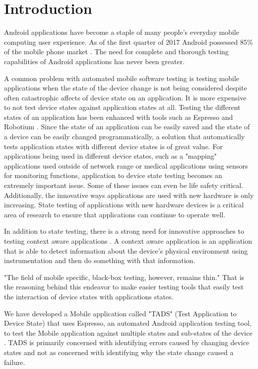 \section{Introduction}
Android applications have become a staple of many people's everyday mobile computing user experience.  As of the first quarter of 2017 Android possessed 85\% of the mobile phone market \cite{chau_2017}.  The need for complete and thorough testing capabilities of Android applications has never been greater.  

A common problem with automated mobile software testing is testing mobile applications when the state of the device change is not being considered despite often catastrophic affects of device state on an application.  It is more expensive to not test device states against application states at all.  Testing the different states of an application has been enhanced with tools such as Espresso and Robotium \cite{optimusinformationinc2016}.  Since the state of an application can be easily saved and the state of a device can be easily changed programmatically, a solution that automatically tests application states with different device states is of great value.  For applications being used in different device states, such as a "mapping" applications used outside of network range or medical applications using sensors for monitoring functions, application to device state testing becomes an extremely important issue.  Some of these issues can even be life safety critical.  Additionally, the innovative ways applications are used with new hardware is only increasing.  State testing of applications with new hardware devices is a critical area of research to ensure that applications can continue to operate well. 

In addition to state testing, there is a strong need for innovative approaches to testing context aware applications \cite{Luo:2017:TLT:3139486.3130945}.  A context aware application is an application that is able to detect information about the device's physical environment using instrumentation and then do something with that information.  

"The field of mobile specific, black-box testing, however, remains thin." \cite{paulovsky2017high}  That is the reasoning behind this endeavor to make easier testing tools that easily test the interaction of device states with applications states.  

We have developed a Mobile application called "TADS" (Test Application to Device State) that uses Espresso, an automated Android application testing tool, to test the Mobile application against multiple states and sub-states of the device \cite{366932}.  TADS is primarily concerned with identifying errors caused by changing device states and not as concerned with identifying why the state change caused a failure.

